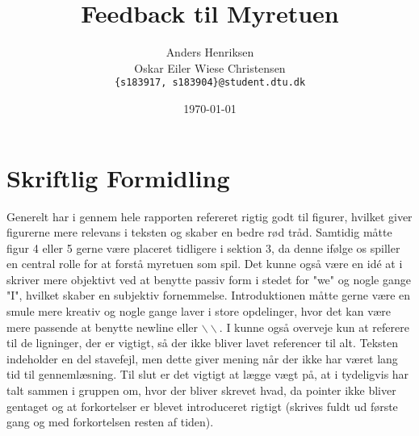 \documentclass[11pt, fleqn, titlepage]{article}
\title{Feedback til Myretuen}
\author{Anders Henriksen \\ Oskar Eiler Wiese Christensen  \\ \texttt{\{s183917, s183904\}@student.dtu.dk}}
\date{\today}
\begin{document}
	
	\maketitle
	
	\section*{Skriftlig Formidling}
	Generelt har i gennem hele rapporten refereret rigtig godt til figurer, hvilket giver figurerne mere relevans i teksten og skaber en bedre rød tråd. Samtidig måtte figur 4 eller 5 gerne være placeret tidligere i sektion 3, da denne ifølge os spiller en central rolle for at forstå myretuen som spil. Det kunne også være en idé at i skriver mere objektivt ved at benytte passiv form i stedet for "we" og nogle gange "I", hvilket skaber en subjektiv fornemmelse. Introduktionen måtte gerne være en smule mere kreativ og nogle gange laver i store opdelinger, hvor det kan være mere passende at benytte newline eller $\backslash \backslash$. I kunne også overveje kun at referere til de ligninger, der er vigtigt, så der ikke bliver lavet referencer til alt. Teksten indeholder en del stavefejl, men dette giver mening når der ikke har været lang tid til gennemlæsning. Til slut er det vigtigt at lægge vægt på, at i tydeligvis har talt sammen i gruppen om, hvor der bliver skrevet hvad, da pointer ikke bliver gentaget og at forkortelser er blevet introduceret rigtigt (skrives fuldt ud første gang og med forkortelsen resten af tiden).
	
\end{document}
